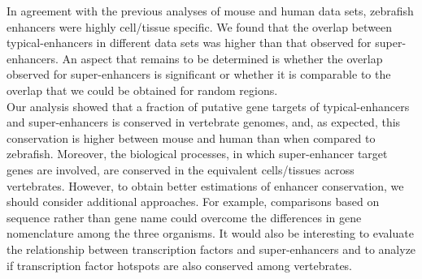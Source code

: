 	In agreement with the previous analyses of mouse and human data sets, zebrafish enhancers were highly cell/tissue specific. We found that the overlap between typical-enhancers in different data sets was higher than that observed for super-enhancers. An aspect that remains to be determined is whether the overlap observed for super-enhancers is significant or whether it is comparable to the overlap that we could be obtained for random regions.\\

	Our analysis showed that a fraction of putative gene targets of typical-enhancers and super-enhancers is conserved in vertebrate genomes, and, as expected, this conservation is higher between mouse and human than when compared to zebrafish. Moreover, the biological processes, in which super-enhancer target genes are involved, are conserved in the equivalent cells/tissues across vertebrates. However, to obtain better estimations of enhancer conservation, we should consider additional approaches. For example, comparisons based on sequence rather than gene name could overcome the differences in gene nomenclature among the three organisms. It would also be interesting to evaluate the relationship between transcription factors and super-enhancers and to analyze if transcription factor hotspots are also conserved among vertebrates.\\

